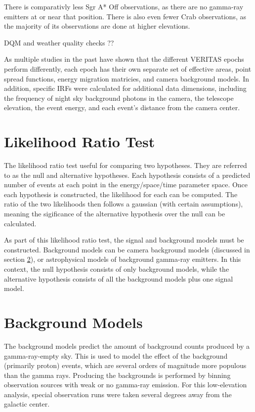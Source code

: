   There is comparativly less Sgr A* Off observations, as there are no gamma-ray emitters at or near that position.
  There is also even fewer Crab observations, as the majority of its observations are done at higher elevations.



  DQM and weather quality checks ??

  As multiple studies in the past have shown that the different VERITAS epochs perform differently, each epoch has their own separate set of effective areas, point spread functions, energy migration matricies, and camera background models.
  In addition, specific IRFs were calculated for additional data dimensions, including the frequency of night sky background photons in the camera, the telescope elevation, the event energy, and each event's distance from the camera center.

\section{Likelihood Ratio Test}
  The likelihood ratio test useful for comparing two hypotheses.
  They are referred to as the null and alternative hypotheses.
  Each hypothesis consists of a predicted number of events at each point in the energy/space/time parameter space.
  Once each hypothesis is constructed, the likelihood for each can be computed.
  The ratio of the two likelihoods then follows a gaussian (with certain assumptions), meaning the sigificance of the alternative hypothesis over the null can be calculated.

  As part of this likelihood ratio test, the signal and background models must be constructed.
  Background models can be camera background models (discussed in section \ref{sec:bkgmodels}), or astrophysical models of background gamma-ray emitters.
  In this context, the null hypothesis consists of only background models, while the alternative hypothesis consists of all the background models plus one signal model.

\section{Background Models}\label{sec:bkgmodels}
  The background models predict the amount of background counts produced by a gamma-ray-empty sky.
  This is used to model the effect of the background (primarily proton) events, which are several orders of magnitude more populous than the gamma rays.
  Producing the backgrounds is performed by binning observation sources with weak or no gamma-ray emission.
  For this low-elevation analysis, special observation runs were taken several degrees away from the galactic center.

